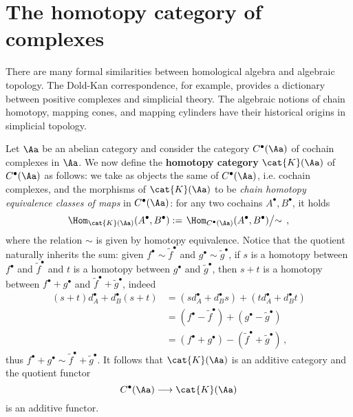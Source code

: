 
\section{The homotopy category of complexes} %

There are many formal similarities between
homological algebra and algebraic topology. 
The Dold-Kan correspondence, for example, 
provides a dictionary between 
positive complexes and simplicial theory. 
The algebraic notions of chain homotopy, mapping cones, 
and mapping cylinders have their historical 
origins in simplicial topology.

Let $\Aa$ be an abelian category and consider the
category $C^{\bullet}(\Aa)$ of cochain complexes in $\Aa$.
We now define the \textbf{homotopy category} $\cat{K}(\Aa)$ of $C^{\bullet}(\Aa)$
as follows: we take as objects the same of $C^{\bullet}(\Aa)$,
i.e. cochain complexes, 
and the morphisms of $\cat{K}(\Aa)$ to be
\emph{chain homotopy equivalence classes of maps} in $C^{\bullet}(\Aa)$:
for any two cochains $A^{\bullet}, B^{\bullet}$, it holds
\begin{equation*}
    \Hom_{\cat{K}(\Aa)}(A^{\bullet}, B^{\bullet}) :=
    \left. \Hom_{C^{\bullet}(\Aa)}(A^{\bullet}, B^{\bullet}) \middle/ \sim \right. \,,
\end{equation*}
where the relation $\sim$ is given by homotopy equivalence.
Notice that the quotient naturally inherits
the sum: given $f^{\bullet} \sim \tilde{f}^{\bullet}$ 
and $g^{\bullet} \sim \tilde{g}^{\bullet}$,
if $s$ is a homotopy between $f^{\bullet}$ and $\tilde{f}^{\bullet}$
and $t$ is a homotopy between $g^{\bullet}$ and $\tilde{g}^{\bullet}$,
then $s+t$ is a homotopy between $f^{\bullet} + g^{\bullet}$ 
and $\tilde{f}^{\bullet} + \tilde{g}^{\bullet}$, indeed
\begin{align*}
    (s+t)d_{A}^{\bullet} + d_{B}^{\bullet}(s+t)
    &= (sd_{A}^{\bullet} + d_{B}^{\bullet}s)
    + (td_{A}^{\bullet} + d_{B}^{\bullet}t) \\
    &= (f^{\bullet} - \tilde{f}^{\bullet}) + (g^{\bullet} - \tilde{g}^{\bullet}) \\
    &= (f^{\bullet} + g^{\bullet}) - (\tilde{f}^{\bullet} + \tilde{g}^{\bullet})\,, 
\end{align*}
thus $f^{\bullet} + g^{\bullet} \sim \tilde{f}^{\bullet} + \tilde{g}^{\bullet}$.
It follows that $\cat{K}(\Aa)$ is an additive category and the quotient functor
\begin{equation*}
    C^{\bullet}(\Aa) \longrightarrow \cat{K}(\Aa)
\end{equation*}
is an additive functor. 

